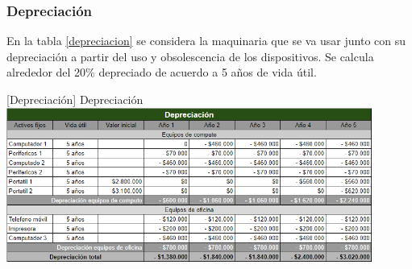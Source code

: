 \subsubsection{Depreciación}

En la tabla \ref{depreciacion} se considera la maquinaria que se va usar junto con su depreciación a partir del uso y obsolescencia de los dispositivos. Se calcula alrededor del 20\% depreciado de acuerdo a 5 años de vida útil.


\vspace{2mm}
\begin{minipage}{0.9\textwidth}
\centering
{}[{Depreciación}]{ Depreciación }
\label{depreciacion}
\includegraphics[width=0.9\textwidth]{Images/depreciacion.png}
\end{minipage}